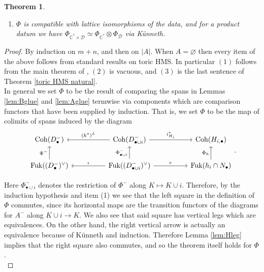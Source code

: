 \documentclass[11pt]{amsart}
\newtheorem{thm}{Theorem}[section]
\theoremstyle{definition}
\theoremstyle{remark}
\newcommand{\Coh}{\mathrm{Coh}}
\newcommand{\Fuk}{\mathrm{Fuk}}
\renewcommand{\emptyset}{\varnothing}
\numberwithin{equation}{section}
\begin{document}
\begin{thm}
\begin{enumerate}
\noindent Here $\Phi^-:=\Phi_{Q,\Sigma,A^-}$ and $\Phi_h:=\Phi_{\mathrm{pt}}\otimes\Phi''$, where $\Phi''$ is the equivalence for $(Q^{/i},\Sigma_{/i},A_{/i})$ supplied by induction via $H_i\cong\mathcal A(Q^{/i})_{\Sigma_{/i},A_{/i}}$ and $H_i^\vee=\mathcal X(Q^{/i})_{\Sigma_{/i},A_{/i}}$. Diagrams for $A^-$ are restricted to $\Delta_{\Sigma,A}$, and those for $H_i$ and $h_i$ are extended by $0$ off $link(i)$.

\item $\Phi$ is compatible with lattice isomorphisms of the data, and for a product datum we have $\Phi_{\mathbb C^*\times\mathcal D}\simeq\Phi_{\mathbb C^*}\otimes\Phi_{\mathcal D}$ via K\"unneth.
\end{enumerate}
\end{thm}

\begin{proof}
    By induction on $m + n$, and then on $|A|$. When $A = \emptyset$ then every item of the above follows from standard results on toric HMS. In particular $(1)$ follows from the main theorem of \cite{gammage2022mirror}, $(2)$ is vacuous, and $(3)$ is the last sentence of Theorem \ref{toric HMS natural}.\\

   In general we set $
   \Phi$ to be the result of comparing the spans in Lemmas \ref{lem:Bglue} and \ref{lem:Aglue} termwise via components which are comparison functors that have been supplied by induction. That is, we set $\Phi$ to be the map of colimits of spans induced by the diagram $$
 \begin{tikzcd}
{\Coh(D_\bullet^-)} &  & \Coh(D_{\bullet \cup i}^-) \arrow[rr, "i^*_{H_i}"] \arrow[ll, "(k^*)^L"'] &  & \Coh(H_{i,\bullet}) \\
\Fuk((D_\bullet^-)^\vee) \arrow[u, "\Phi^-"]                          &  & \Fuk((D_{\bullet \cup i}^-)^\vee) \arrow[ll, "\iota"'] \arrow[rr, "r"] \arrow[u, "\Phi^-_{\bullet\cup i}"]                                                      &  & \Fuk(h_i \cap N_\bullet) \arrow[u, "\Phi_h"]
\end{tikzcd}.$$

Here $\Phi^-_{\bullet\cup i}$ denotes the restriction of $\Phi^-$ along $K\mapsto K\cup i$. Therefore, by the induction hypothesis and item (1) we see that the left square in the definition of $\Phi$ commutes, since its horizontal maps are the transition functors of the diagrams for $A^-$ along $K\cup i\to K$. We also see that said square has vertical legs which are equivalences. On the other hand, the right vertical arrow is actually an equivalence because of K\"unneth and induction. Therefore Lemma \ref{lem:Hleg} implies that the right square also commutes, and so the theorem itself holds for $
\Phi$.\\


\end{proof}
\end{document}
